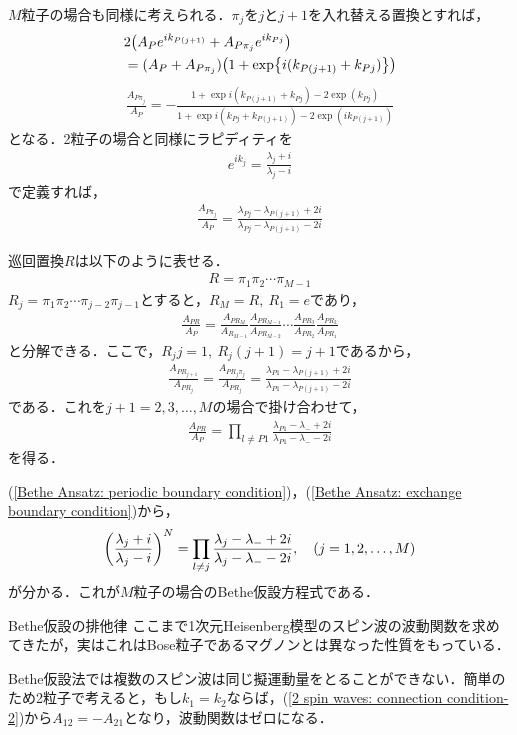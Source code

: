 \documentclass[\main/main.tex]{subfiles}
\begin{document}
\begin{frame}
    $M$粒子の場合も同様に考えられる．$\pi_j$を$j$と$j+1$を入れ替える置換とすれば，
    \begin{align}
        &\nonumber
        2\qty(A_P e^{ik_{P(j+1)}}+A_{P\pi_j}e^{ik_{Pj}})
        \\ &
        = (A_P+A_{P\pi_j})\qty(1+\exp{i(k_{P(j+1)}+k_{Pj})})
    \end{align}
    \begin{align}
        \frac{A_{P\pi_j}}{A_P} = -\frac{1+\exp{i(k_{P(j+1)}+k_{Pj})}-2\exp(k_{Pj})}{1+\exp{i(k_{Pj}+k_{P(j+1)})}-2\exp(ik_{P(j+1)})}
    \end{align}
    となる．2粒子の場合と同様にラピディティを
    \begin{align}
        e^{ik_j} = \frac{\lambda_j + i}{\lambda_j - i}
    \end{align}
    で定義すれば，
    \begin{align}
        \frac{A_{P\pi_j}}{A_P} = \frac{\lambda_{Pj}-\lambda_{P(j+1)}+2i}{\lambda_{Pj}-\lambda_{P(j+1)}-2i}
    \end{align}
\end{frame}
\begin{frame}
    巡回置換$R$は以下のように表せる．
    \begin{align}
        R = \pi_1 \pi_2 \cdots \pi_{M-1}
    \end{align}
    $R_j = \pi_1 \pi_2 \cdots \pi_{j-2}\pi_{j-1}$とすると，$R_{M} = R,~ R_1 = e$であり，
    \begin{align}
        \frac{A_{PR}}{A_P}
        = \frac{A_{PR_M}}{A_{R_{M-1}}}
        \frac{A_{PR_{M-1}}}{A_{PR_{M-2}}} \cdots \frac{A_{PR_3}}{A_{PR_2}} \frac{A_{PR_2}}{A_{PR_1}}
    \end{align}
    と分解できる．ここで，$R_j j = 1,~R_j(j+1) = j+1$であるから，
    \begin{align}
        \frac{A_{PR_{j+1}}}{A_{PR_j}} = \frac{A_{PR_j \pi_j}}{A_{PR_j}} = \frac{\lambda_{P1}-\lambda_{P(j+1)}+2i}{\lambda_{P1}-\lambda_{P(j+1)}-2i}
    \end{align}
    である．これを$j+1 = 2,3,\ldots,M$の場合で掛け合わせて，
    \begin{align}
        \frac{A_{PR}}{A_P} = \prod_{l \ne P1}\frac{\lambda_{P1}-\lambda_-+2i}{\lambda_{P1}-\lambda_--2i}
        \label{Bethe Ansatz: exchange boundary condition}
    \end{align}
    を得る．
\end{frame}

\begin{frame}
    (\ref{Bethe Ansatz: periodic boundary condition})，(\ref{Bethe Ansatz: exchange boundary condition})から，
    \begin{align}
        \qty(\frac{\lambda_j + i}{\lambda_j - i})^N = \prod_{l \ne j}\frac{\lambda_{j}-\lambda_-+2i}{\lambda_{j}-\lambda_--2i},
        \quad
        (j = 1,2,\ldots,M)
    \end{align}
    が分かる．これが$M$粒子の場合のBethe仮設方程式である．
\end{frame}

\begin{frame}{Bethe仮設の排他律}
    ここまで1次元Heisenberg模型のスピン波の波動関数を求めてきたが，実はこれはBose粒子であるマグノンとは異なった性質をもっている．

    Bethe仮設法では複数のスピン波は同じ擬運動量をとることができない．簡単のため2粒子で考えると，もし$k_1 = k_2$ならば，(\ref{2 spin waves: connection condition-2})から$A_{12} = - A_{21}$となり，波動関数はゼロになる．
\end{frame}
\end{document}

